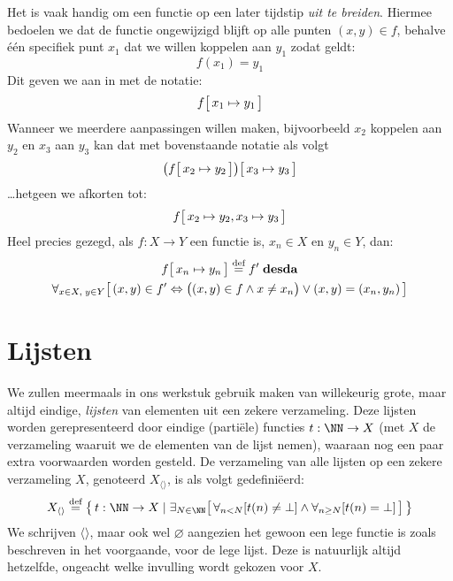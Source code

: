 Het is vaak handig om een functie op een later tijdstip \emph{uit te breiden}. Hiermee bedoelen we dat de functie ongewijzigd blijft op alle punten $(x, y) \in f$, behalve één specifiek punt $x_1$ dat we willen koppelen aan $y_1$ zodat geldt:
%
\begin{equation*}
  f(x_1) = y_1
\end{equation*}
%
Dit geven we aan in met de notatie:
%
\begin{equation*}
  f\big[\, x_1 \mapsto y_1 \,\big]
\end{equation*}
%
Wanneer we meerdere aanpassingen willen maken, bijvoorbeeld $x_2$ koppelen aan $y_2$ en $x_3$ aan $y_3$ kan dat met bovenstaande notatie als volgt
%
\begin{equation*}
  \big(f\big[\, x_2 \mapsto y_2 \,\big]\big)\big[\, x_3 \mapsto y_3 \,\big]
\end{equation*}
%
\dots hetgeen we afkorten tot:
%
\begin{equation*}
  f\big[\, x_2 \mapsto y_2, x_3 \mapsto y_3 \,\big]
\end{equation*}
%
Heel precies gezegd, als $f : X \to Y$ een functie is, $x_n \in X$ en $y_n \in Y$, dan:
%
\begin{multline*}
  f\surr{ x_n \mapsto y_n } \DEF f' \;\mathbf{desda} \\
  \forall_{x \in X,\; y \in Y} \surr{ (x, y) \in f' \Leftrightarrow \big( (x, y) \in f \land x \neq x_n \big) \lor (x, y) = (x_n, y_n) }
\end{multline*}

\section{Lijsten}

We zullen meermaals in ons werkstuk gebruik maken van willekeurig grote, maar altijd eindige, \emph{lijsten} van elementen uit een zekere verzameling. Deze lijsten worden gerepresenteerd door eindige (partiële) functies $t : \NN \to X$ (met $X$ de verzameling waaruit we de elementen van de lijst nemen), waaraan nog een paar extra voorwaarden worden gesteld. De verzameling van alle lijsten op een zekere verzameling $X$, genoteerd $X_{\langle\rangle}$, is als volgt gedefiniëerd:
\begin{equation*}
X_{\langle\rangle} \DEF \big\{\, t : \NN \to X \mid \exists_{N \in \NN} \surr{ \forall_{n < N}[t(n) \neq \bot] \land \forall_{n\ge N}[t(n) = \bot] } \,\big\}
\end{equation*}
We schrijven $\langle\rangle$, maar ook wel $\varnothing$ aangezien het gewoon een lege functie is zoals beschreven in het voorgaande, voor de lege lijst. Deze is natuurlijk altijd hetzelfde, ongeacht welke invulling wordt gekozen voor $X$.

